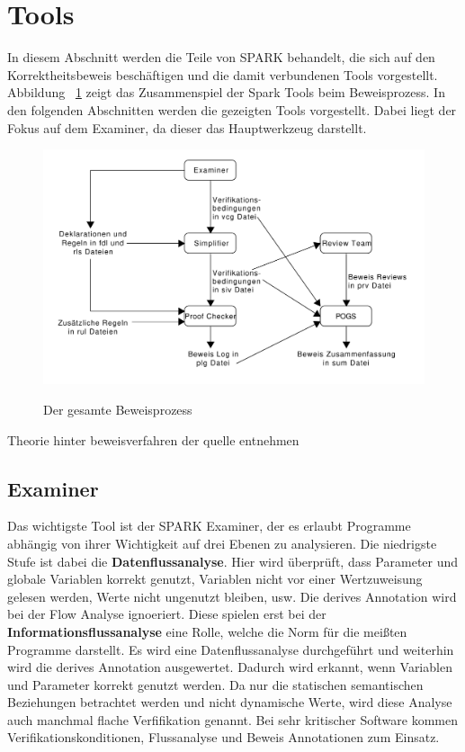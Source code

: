 
\section{Tools}
\label{sec:tools}
In diesem Abschnitt werden die Teile von SPARK behandelt, die sich auf den Korrektheitsbeweis beschäftigen und die damit verbundenen Tools vorgestellt.
Abbildung ~\ref{fig:proofProcess} zeigt das Zusammenspiel der Spark Tools beim Beweisprozess. In den folgenden Abschnitten werden die gezeigten Tools vorgestellt. Dabei liegt der Fokus auf dem Examiner, da dieser das Hauptwerkzeug darstellt.

\begin{figure}[h]
\includegraphics[width=\textwidth{}]{images/ProofProcess.pdf}
\label{fig:proofProcess}
\caption{Der gesamte Beweisprozess}
\end{figure}
Theorie hinter beweisverfahren der quelle entnehmen

\subsection{Examiner}
\label{sec:examiner}
Das wichtigste Tool ist der SPARK Examiner, der es erlaubt Programme abhängig von ihrer Wichtigkeit auf drei Ebenen zu analysieren. Die niedrigste Stufe ist dabei die \textbf{Datenflussanalyse}. Hier wird überprüft, dass Parameter und globale Variablen korrekt genutzt, Variablen nicht vor einer Wertzuweisung gelesen werden, Werte nicht ungenutzt bleiben, usw. Die derives Annotation wird bei der Flow Analyse ignoeriert.
Diese spielen erst bei der \textbf{Informationsflussanalyse} eine Rolle, welche die Norm für die meißten Programme darstellt. Es wird eine Datenflussanalyse durchgeführt und weiterhin wird die derives Annotation ausgewertet. Dadurch wird erkannt, wenn Variablen und Parameter korrekt genutzt werden. Da nur die statischen semantischen Beziehungen betrachtet werden und nicht dynamische Werte, wird diese Analyse auch manchmal flache Verfifikation genannt.
Bei sehr kritischer Software kommen Verifikationskonditionen, Flussanalyse und Beweis Annotationen zum Einsatz.

